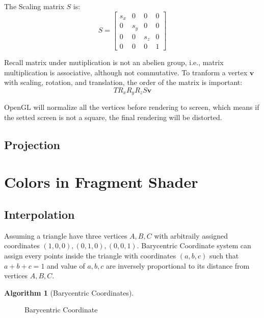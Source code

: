 \documentclass[12pt, a4paper]{article}
\theoremstyle{definition}
\newtheorem{algorithm}{Algorithm}[section]
\theoremstyle{remark}
\begin{document}
The Scaling matrix $S$ is:
\begin{equation}\label{eq:scaling}
	S = 
	\begin{bmatrix}
	s_x & 0 & 0 & 0\\
	0 & s_y & 0 & 0\\
	0 & 0 & s_z & 0\\
	0 & 0 & 0 & 1
	\end{bmatrix}
\end{equation}

Recall matrix under mutiplication is not an abelien group, i.e., matrix multiplication is associative, although not commutative.
To tranform a vertex $\bm{v}$ with scaling, rotation, and translation, the order of the matrix is important:
\begin{equation}\label{eq:combinedTransformation}
TR_xR_yR_zS\bm{v}
\end{equation}

OpenGL will normalize all the vertices before rendering to screen, which means if the setted screen is not a square, the final rendering will be distorted.

\subsection{Projection}

\section{Colors in Fragment Shader}

\subsection{Interpolation}
Assuming a triangle have three vertices $A, B, C$ with arbitraily assigned coordinates $(1,0,0), (0,1,0),(0,0,1)$. Barycentric Coordinate system can assign every points inside the triangle with coordinates $(a,b,c)$ such that $a+b+c=1$ and value of $a,b,c$ are inversely proportional to its distance from vertices $A, B, C$.
\begin{algorithm}[Barycentric Coordinates]

\end{algorithm}

\begin{figure}[h]
\centering
{}
	\caption{Barycentric Coordinate}
\end{figure}
\end{document}
